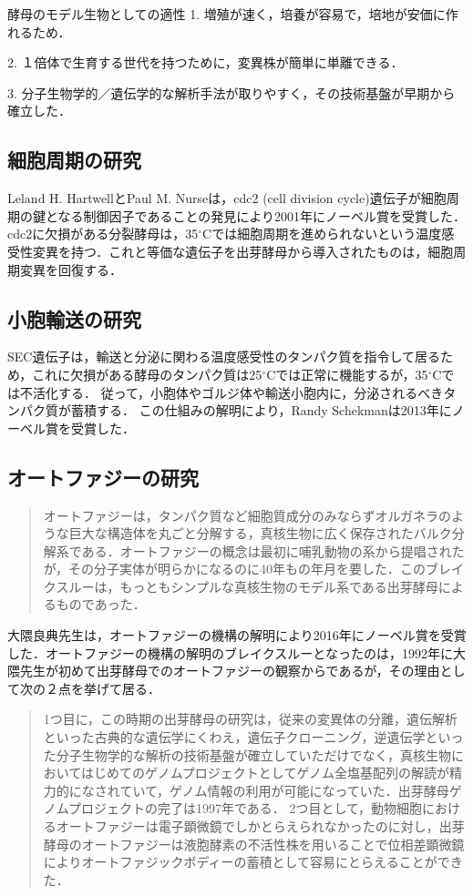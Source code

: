 \documentclass[uplatex, dvipdfmx]{jsarticle}
\begin{document}
\begin{itembox}[l]{酵母のモデル生物としての適性}
    1. 増殖が速く，培養が容易で，培地が安価に作れるため．

    2. １倍体で生育する世代を持つために，変異株が簡単に単離できる．

    3. 分子生物学的／遺伝学的な解析手法が取りやすく，その技術基盤が早期から確立した．
\end{itembox}

\subsection{細胞周期の研究}
Leland H. HartwellとPaul M. Nurseは，cdc2 (cell division cycle)遺伝子が細胞周期の鍵となる制御因子であることの発見により2001年にノーベル賞を受賞した．
cdc2に欠損がある分裂酵母は，35$^\circ\mathrm{C}$では細胞周期を進められないという温度感受性変異を持つ．これと等価な遺伝子を出芽酵母から導入されたものは，細胞周期変異を回復する．\cite{Essential}

\subsection{小胞輸送の研究}
SEC遺伝子は，輸送と分泌に関わる温度感受性のタンパク質を指令して居るため，これに欠損がある酵母のタンパク質は25$^\circ\mathrm{C}$では正常に機能するが，35$^\circ\mathrm{C}$では不活化する．
従って，小胞体やゴルジ体や輸送小胞内に，分泌されるべきタンパク質が蓄積する\cite{Essential}．
この仕組みの解明により，Randy Schekmanは2013年にノーベル賞を受賞した．

\subsection{オートファジーの研究}
\begin{quotation}
    オートファジーは，タンパク質など細胞質成分のみならずオルガネラのような巨大な構造体を丸ごと分解する，真核生物に広く保存されたバルク分解系である．オートファジーの概念は最初に哺乳動物の系から提唱されたが，その分子実体が明らかになるのに40年もの年月を要した．このブレイクスルーは，もっともシンプルな真核生物のモデル系である出芽酵母によるものであった．\cite{大隈}
\end{quotation}
大隈良典先生は，オートファジーの機構の解明により2016年にノーベル賞を受賞した．オートファジーの機構の解明のブレイクスルーとなったのは，1992年に大隈先生が初めて出芽酵母でのオートファジーの観察からであるが，その理由として次の２点を挙げて居る．
\begin{quotation}
    1つ目に，この時期の出芽酵母の研究は，従来の変異体の分離，遺伝解析といった古典的な遺伝学にくわえ，遺伝子クローニング，逆遺伝学といった分子生物学的な解析の技術基盤が確立していただけでなく，真核生物においてはじめてのゲノムプロジェクトとしてゲノム全塩基配列の解読が精力的になされていて，ゲノム情報の利用が可能になっていた．出芽酵母ゲノムプロジェクトの完了は1997年である．
    2つ目として，動物細胞におけるオートファジーは電子顕微鏡でしかとらえられなかったのに対し，出芽酵母のオートファジーは液胞酵素の不活性株を用いることで位相差顕微鏡によりオートファジックボディーの蓄積として容易にとらえることができた．\cite{大隈}
\end{quotation}
\end{document}
